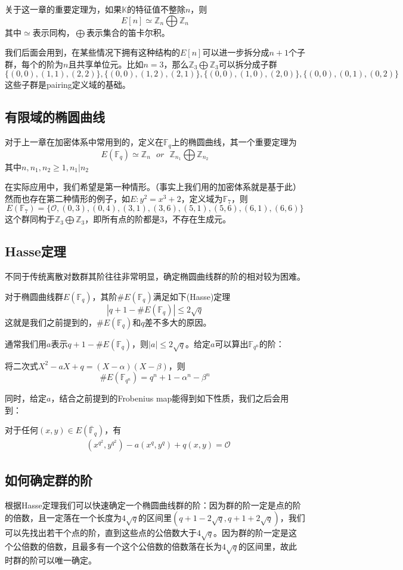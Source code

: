 \documentclass[12pt]{article}
\newcommand{\ec}{椭圆曲线}
\newcommand{\oo}{\mathcal{O}}
\newcommand{\fq}{\mathbb{F}_q}
\begin{document}
关于这一章的重要定理为，如果$\mathbb{K}$的特征值不整除$n$，则
$$E[n] \simeq \mathbb{Z}_n \bigoplus  \mathbb{Z}_n$$
其中$\simeq$表示同构，$ \bigoplus$表示集合的笛卡尔积。

我们后面会用到，在某些情况下拥有这种结构的$E[n]$可以进一步拆分成$n+1$个子群，每个的阶为$n$且共享单位元。比如$n=3$，那么$ \mathbb{Z}_3 \bigoplus  \mathbb{Z}_3$可以拆分成子群
$$\{(0,0),(1,1),(2,2)\},\{(0,0),(1,2),(2,1)\},\{(0,0),(1,0),(2,0)\},\{(0,0),(0,1),(0,2)\}$$
这些子群是pairing定义域的基础。
\subsection{有限域的\ec}
对于上一章在加密体系中常用到的，定义在$\fq$上的椭圆曲线，其一个重要定理为
$$E(\fq) \simeq \mathbb{Z}_n~~~or~~~\mathbb{Z}_{n_1} \bigoplus \mathbb{Z}_{n_2}$$
其中$n,n_1,n_2 \geq 1,n_1|n_2$

在实际应用中，我们希望是第一种情形。（事实上我们用的加密体系就是基于此）然而也存在第二种情形的例子，如$E:y^2=x^3+2$，定义域为$\mathbb{F}_7$，则
$$E(\mathbb{F}_7) = \{ \oo, (0,3),(0,4),(3,1),(3,6),(5,1),(5,6),(6,1),(6,6)\}$$
这个群同构于$ \mathbb{Z}_3 \bigoplus  \mathbb{Z}_3$，即所有点的阶都是$3$，不存在生成元。
\subsection{Hasse定理}
不同于传统离散对数群其阶往往非常明显，确定\ec 群的阶的相对较为困难。

对于\ec 群$E(\mathbb{F}_q)$，其阶$\#E(\mathbb{F}_q)$满足如下(Hasse)定理
$$|q+1-\#E(\mathbb{F}_q)| \leq 2\sqrt{q}$$
这就是我们之前提到的，$\#E(\mathbb{F}_q)$和$q$差不多大的原因。

通常我们用$a$表示$q+1-\# E(\mathbb{F}_q)$，则$|a| \leq 2\sqrt{q}$。给定$a$可以算出$\mathbb{F}_{q^n}$的阶：

将二次式$X^2-aX+q = (X-\alpha)(X-\beta)$，则
$$\# E(\mathbb{F}_{q^n})=q^n+1-\alpha^n-\beta^n$$

同时，给定$a$，结合之前提到的Frobenius map能得到如下性质，我们之后会用到：

对于任何$(x,y) \in E(\bar{\mathbb{F}}_q)$，有
\begin{align}
	\label{Fro}
& (x^{q^2},y^{q^2})-a(x^q,y^q)+q(x,y) = \oo
\end{align}
\subsection{如何确定群的阶}
根据Hasse定理我们可以快速确定一个\ec 群的阶：因为群的阶一定是点的阶的倍数，且一定落在一个长度为$4\sqrt{q}$的区间里$(q+1-2\sqrt{q},q+1+2\sqrt{q})$，我们可以先找出若干个点的阶，直到这些点的公倍数大于$4\sqrt{q}$。因为群的阶一定是这个公倍数的倍数，且最多有一个这个公倍数的倍数落在长为$4\sqrt{q}$的区间里，故此时群的阶可以唯一确定。
\end{document}
